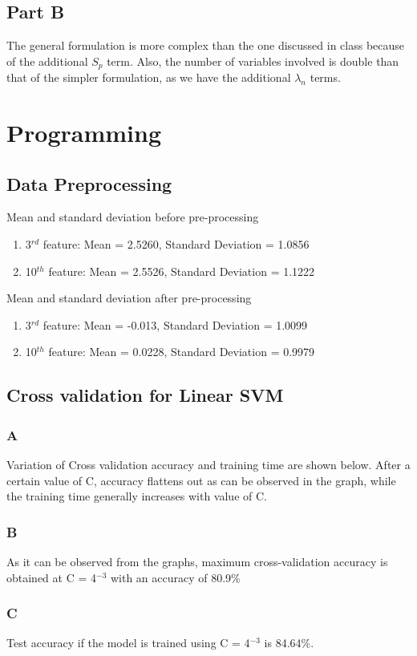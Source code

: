 \documentclass[11pt]{article}
\begin{document}
\subsection{Part B}
The general formulation is more complex than the one discussed in class  because of the additional $S_p$ term. Also, the number of variables involved is double than that of the simpler formulation, as we have the additional $\lambda_n$ terms. 
\section{Programming}
\subsection{Data Preprocessing}
Mean and standard deviation before pre-processing
\begin{enumerate}
	\item 3$^{rd}$ feature: Mean = 2.5260, Standard Deviation = 1.0856
	\item 10$^{th}$ feature: Mean = 2.5526, Standard Deviation = 1.1222
\end{enumerate}
Mean and standard deviation after pre-processing
\begin{enumerate}
	\item 3$^{rd}$ feature: Mean = -0.013, Standard Deviation = 1.0099
	\item 10$^{th}$ feature: Mean = 0.0228, Standard Deviation = 0.9979
\end{enumerate}
\subsection{Cross validation for Linear SVM}
\subsubsection{A}
Variation of Cross validation accuracy and training time are shown below.
After a certain value of C, accuracy flattens out as can be observed in the graph, while the training time generally increases with value of C.
\subsubsection{B}
As it can be observed from the graphs, maximum cross-validation accuracy is obtained at C = 4$^{-3}$ with an accuracy of 80.9\%
\subsubsection{C}
Test accuracy if the model is trained using C = 4$^{-3}$ is 84.64\%.
\end{document}
